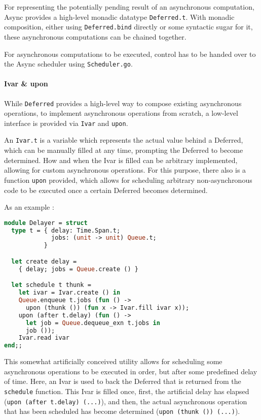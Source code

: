 \documentclass[a4paper,UKenglish,cleveref, autoref, thm-restate]{lipics-v2021}
\begin{document}
For representing the potentially pending result of an asynchronous computation, Async provides a high-level monadic datatype \lstinline{Deferred.t}. With monadic composition, either using \lstinline{Deferred.bind} directly or some syntactic sugar for it, these asynchronous computations can be chained together.

For asynchronous computations to be executed, control has to be handed over to the Async scheduler using \lstinline{Scheduler.go}.

\paragraph*{Ivar \& upon}

While \lstinline{Deferred} provides a high-level way to compose existing asynchronous operations, to implement asynchronous operations from scratch, a low-level interface is provided via \lstinline{Ivar} and \lstinline{upon}.

An \lstinline{Ivar.t} is a variable which represents the actual value behind a Deferred, which can be manually filled at any time, prompting the Deferred to become determined. How and when the Ivar is filled can be arbitrary implemented, allowing for custom asynchronous operations. For this purpose, there also is a function \lstinline{upon} provided, which allows for scheduling arbitrary non-asynchronous code to be executed once a certain Deferred becomes determined.

As an example \cite{Concurre6:online}:

\begin{minipage}{\linewidth}
\begin{lstlisting}[language=Caml,caption={Delayer example},captionpos=t]
module Delayer = struct
  type t = { delay: Time.Span.t;
             jobs: (unit -> unit) Queue.t;
           }

  let create delay =
    { delay; jobs = Queue.create () }

  let schedule t thunk =
    let ivar = Ivar.create () in
    Queue.enqueue t.jobs (fun () ->
      upon (thunk ()) (fun x -> Ivar.fill ivar x));
    upon (after t.delay) (fun () ->
      let job = Queue.dequeue_exn t.jobs in
      job ());
    Ivar.read ivar
end;;
\end{lstlisting}
\end{minipage}

This somewhat artificially conceived utility allows for scheduling some asynchronous operations to be executed in order, but after some predefined delay of time. Here, an Ivar is used to back the Deferred that is returned from the \lstinline{schedule} function. This Ivar is filled once, first, the artificial delay has elapsed (\lstinline{upon (after t.delay) (...)}), and then, the actual asynchronous operation that has been scheduled has become determined (\lstinline{upon (thunk ()) (...)}).
\end{document}
